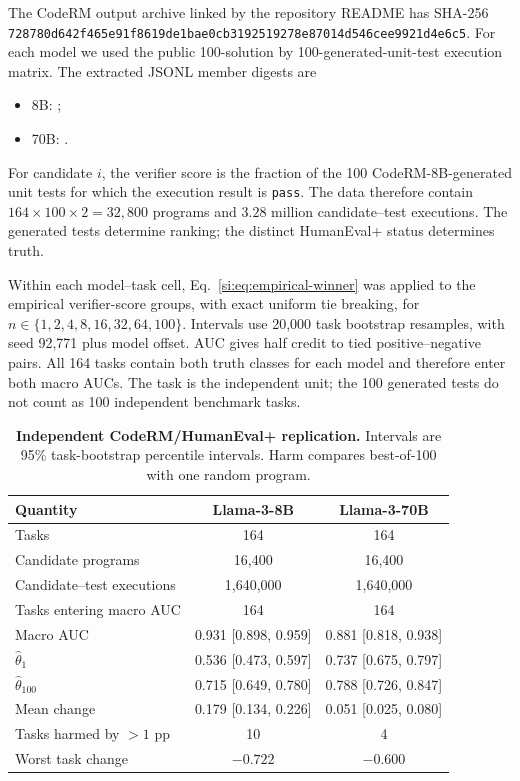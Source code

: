 \documentclass[10pt,twocolumn]{article}
\begin{document}
The CodeRM output archive linked by the repository README has SHA-256
\texttt{728780d642f465e9}\allowbreak\texttt{1f8619de1bae0cb3}\allowbreak\texttt{192519278e87014d}\allowbreak\texttt{546cee9921d4e6c5}. For each model we used the public 100-solution by 100-generated-unit-test execution matrix. The extracted JSONL member digests are
\begin{itemize}
\item 8B: \texttt{};
\item 70B: \texttt{}.
\end{itemize}
For candidate $i$, the verifier score is the fraction of the 100 CodeRM-8B-generated unit tests for which the execution result is \texttt{pass}. The data therefore contain $164\times100\times2=32{,}800$ programs and $3.28$ million candidate--test executions. The generated tests determine ranking; the distinct HumanEval+ status determines truth.

Within each model--task cell, Eq.~\ref{si:eq:empirical-winner} was applied to the empirical verifier-score groups, with exact uniform tie breaking, for $n\in\{1,2,4,8,16,32,64,100\}$. Intervals use 20,000 task bootstrap resamples, with seed 92,771 plus model offset. AUC gives half credit to tied positive--negative pairs. All 164 tasks contain both truth classes for each model and therefore enter both macro AUCs. The task is the independent unit; the 100 generated tests do not count as 100 independent benchmark tasks.

\begin{table}[h]
\centering
\caption{\textbf{Independent CodeRM/HumanEval+ replication.} Intervals are 95\% task-bootstrap percentile intervals. Harm compares best-of-100 with one random program.}
\label{si:tab:coderm-summary}
\begin{tabular}{lcc}
\toprule
Quantity & Llama-3-8B & Llama-3-70B \\
\midrule
Tasks & 164 & 164 \\
Candidate programs & 16,400 & 16,400 \\
Candidate--test executions & 1,640,000 & 1,640,000 \\
Tasks entering macro AUC & 164 & 164 \\
Macro AUC & 0.931 [0.898, 0.959] & 0.881 [0.818, 0.938] \\
$\widehat\theta_1$ & 0.536 [0.473, 0.597] & 0.737 [0.675, 0.797] \\
$\widehat\theta_{100}$ & 0.715 [0.649, 0.780] & 0.788 [0.726, 0.847] \\
Mean change & 0.179 [0.134, 0.226] & 0.051 [0.025, 0.080] \\
Tasks harmed by $>1$ pp & 10 & 4 \\
Worst task change & $-0.722$ & $-0.600$ \\
\bottomrule
\end{tabular}
\end{table}
\end{document}
